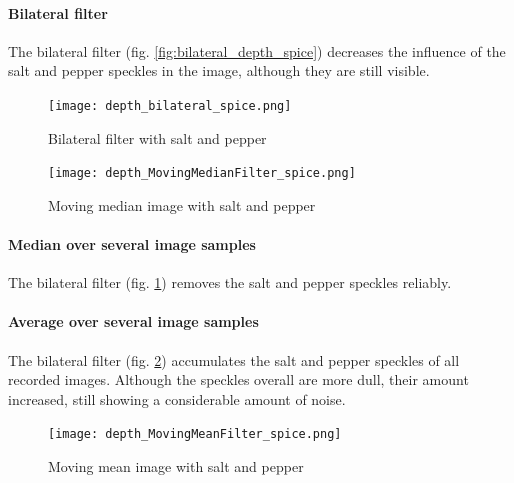 \documentclass[DIV12,a4paper]{scrartcl}
\begin{document}
\paragraph{Bilateral filter}
The bilateral filter (fig. \ref{fig:bilateral_depth_spice}) decreases the influence of the salt and pepper speckles in the image, although they are still visible.
\begin{figure}[h!tbp]
  \centering
  \begin{minipage}{.5\textwidth}
    \centering
    \texttt{[image: depth\_bilateral\_spice.png]}
    \caption{Bilateral filter with salt and pepper}
    \label{fig:bilateral_depth_spice}
  \end{minipage}%
  \begin{minipage}{.5\textwidth}
    \centering
    \texttt{[image: depth\_MovingMedianFilter\_spice.png]}
    \caption{Moving median image with salt and pepper}
    \label{fig:moving_median_depth_spice}
  \end{minipage}
\end{figure}
\paragraph{Median over several image samples}
The bilateral filter (fig. \ref{fig:moving_median_depth_spice}) removes the salt and pepper speckles reliably.
\paragraph{Average over several image samples}
The bilateral filter (fig. \ref{fig:moving_mean_depth_spice}) accumulates the salt and pepper speckles of all recorded images. Although the speckles overall are more dull, their amount increased, still showing a considerable amount of noise.
\begin{figure}[h!tbp]
  \centering
  \texttt{[image: depth\_MovingMeanFilter\_spice.png]}
  \caption{Moving mean image with salt and pepper}
  \label{fig:moving_mean_depth_spice}
\end{figure}
\end{document}
